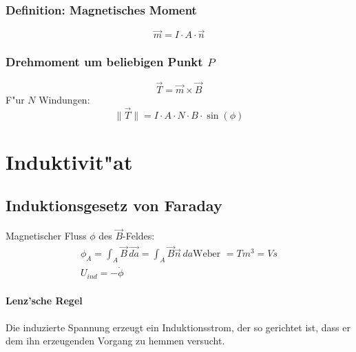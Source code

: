 \subsubsection{Definition: Magnetisches Moment}
\begin{equation}
	\overrightarrow{m}=I\cdot A\cdot\overrightarrow{n}
\end{equation}

\subsubsection{Drehmoment um beliebigen Punkt $P$}
\begin{equation}
	\overrightarrow{T}=\overrightarrow{m}\times\overrightarrow{B}
\end{equation}
\noindent F"ur $N$ Windungen:
\begin{equation}
	\|\overrightarrow{T}\|= I\cdot A\cdot N\cdot B\cdot\sin(\phi)
\end{equation}

\section{Induktivit"at}

\subsection{Induktionsgesetz von Faraday}
Magnetischer Fluss $\phi$ des $\overrightarrow{B}$-Feldes:
\begin{gather}
	\phi_A=\int_A\overrightarrow{B}\,\overrightarrow{da}=\int_A\overrightarrow{B}\overrightarrow{n}\,da\unit{\text{Weber }=Tm^3=Vs} \\
	U_{ind} =-\dot{\phi}
\end{gather}
\paragraph{Lenz'sche Regel}
Die induzierte Spannung erzeugt ein Induktionsstrom, der so gerichtet ist, dass er dem ihn erzeugenden Vorgang zu hemmen versucht.

